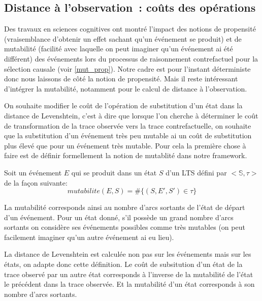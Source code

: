 \documentclass[11pt]{extarticle}
\begin{document}
\subsection{Distance à l'observation : coûts des opérations}

Des travaux en sciences cognitives ont montré l'impact des notions de propensité (vraisemblance d'obtenir un effet sachant qu'un événement se produit) et de mutabilité (facilité avec laquelle on peut imaginer qu'un événement ai été différent) des événements lors du processus de raisonnement contrefactuel pour la sélection causale (voir \ref{mut_prop}). Notre cadre est pour l'instant déterministe donc nous laissons de côté la notion de propensité. Mais il reste intéressant d'intégrer la mutabilité, notamment pour le calcul de distance à l'observation. 


On souhaite modifier le coût de l'opération de substitution d'un état dans la distance de Levenshtein, c'est à dire que lorsque l'on cherche à déterminer le coût de transformation de la trace observée vers la trace contrefactuelle, on souhaite que la substitution d'un événement très peu mutable ai un coût de substitution plus élevé que pour un événement très mutable. Pour cela la première chose à faire est de définir formellement la notion de mutablité dans notre framework. 

Soit un événement $E$ qui se produit dans un état $S$ d'un LTS défini par $<\mathds{S},\tau>$ de la façon suivante:
\begin{equation}
    mutabilite(E,S) =\#\{(S,E',S')\in \tau\}
\end{equation}

La mutabilité corresponds ainsi au nombre d'arcs sortants de l'état de départ d'un événement. Pour un état donné, s'il possède un grand nombre d'arcs sortants on considère ses événements possibles comme très mutables (on peut facilement imaginer qu'un autre événement ai eu lieu).

La distance de Levenshtein est calculée non pas sur les événements mais sur les états, on adapte donc cette définition. Le coût de subsitution d'un état de la trace observé par un autre état corresponds à l'inverse de la mutabilité de l'état le précédent dans la trace observée. Et la mutabilité d'un état corresponds à son nombre d'arcs sortants.
\end{document}
